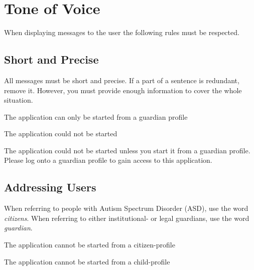 
\chapter{Tone of Voice}
When displaying messages to the user the following rules must be respected.

\section{Short and Precise}
All messages must be short and precise. If a part of a sentence is redundant, remove it. However, you must provide enough information to cover the whole situation.

\begin{exampleR}
	The application can only be started from a guardian profile
\end{exampleR}

\begin{exampleW}
	The application could not be started
\end{exampleW}

\begin{exampleW}
	The application could not be started unless you start it from a guardian profile. Please log onto a guardian profile to gain access to this application.
\end{exampleW}

\section{Addressing Users}
When referring to people with Autism Spectrum Disorder (ASD), use the word \textit{citizens}. When referring to either institutional- or legal guardians, use the word \textit{guardian}.

\begin{exampleR}
	The application cannot be started from a citizen-profile
\end{exampleR}

\begin{exampleW}
	The application cannot be started from a child-profile
\end{exampleW}